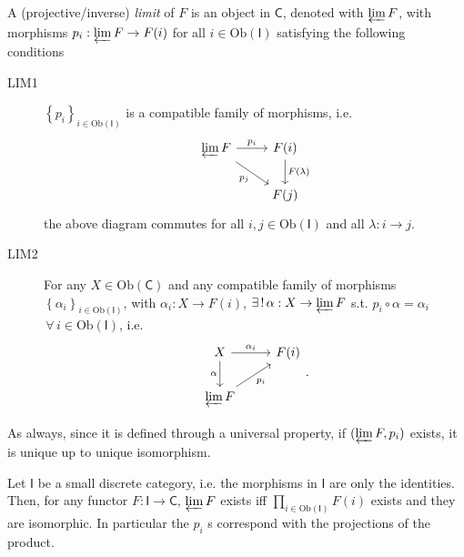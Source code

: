 \begin{defn}
	A (projective/inverse) {\em limit} of $F$ is an object in $\mathsf{C}$, denoted with $\varprojlim F$, with morphisms
	$p_i: \varprojlim F \to F(i)$ for all $i \in \mathrm{Ob} \left(\mathsf{I}\right)$ satisfying the following conditions
	\begin{description}
		\item[LIM1] $\left\{ p_i \right\}_{i \in \mathrm{Ob} \left(\mathsf{I}\right)}$ is a compatible family of morphisms, i.e.
			\begin{equation}
			\begin{tikzcd}
				\varprojlim F \arrow[r, "p_i", rightarrow] \arrow[rd, "p_j"', rightarrow] &
				F(i) \arrow[d, "F(\lambda)", rightarrow] \\
				&
				F(j)
			\end{tikzcd}
			\end{equation} 
			the above diagram commutes for all $i, j \in \mathrm{Ob} \left(\mathsf{I}\right)$ and all $\lambda: i \to j$.
		\item[LIM2] For any $X \in \mathrm{Ob} \left(\mathsf{C}\right)$ and any compatible family of morphisms $\left\{ \alpha_i \right\}_{i \in \mathrm{Ob} \left(\mathsf{I}\right)}$, with $\alpha_i: X \to F(i)$, 
			$\exists\, !\, \alpha: X \to \varprojlim F$ s.t. $p_i \circ \alpha = \alpha_i$ $\,\forall\, i \in \mathrm{Ob} \left(\mathsf{I}\right)$, i.e.
			\begin{equation}
			\begin{tikzcd}
				X \arrow[r, "\alpha_i", rightarrow] \arrow[d, "\alpha"', rightarrow] &
				F(i)\\
				\varprojlim F \arrow[ru, "p_i"', rightarrow]  
			\end{tikzcd}
			.\end{equation} 
	\end{description} 
\end{defn}

\begin{rem}
	As always, since it is defined through a universal property, if $(\varprojlim F, p_i)$ exists, it is unique up to unique isomorphism.
\end{rem}

\begin{ex}
	Let $\mathsf{I}$ be a small discrete category, i.e. the morphisms in $\mathsf{I}$ are only the identities.
	Then, for any functor $F: \mathsf{I} \to \mathsf{C}$, $\varprojlim F$ exists iff 
	$\prod_{i \in \mathrm{Ob} \left(\mathsf{I}\right)} F(i)$ exists and they are isomorphic.
	In particular the $p_i$ s correspond with the projections of the product.
\end{ex} 

